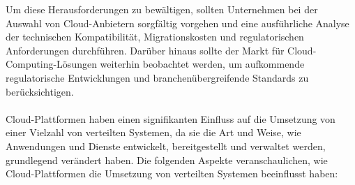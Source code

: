 Um diese Herausforderungen zu bewältigen, sollten Unternehmen bei der Auswahl von Cloud-Anbietern sorgfältig vorgehen und eine ausführliche Analyse der technischen Kompatibilität, Migrationskosten und regulatorischen Anforderungen durchführen. Darüber hinaus sollte der Markt für Cloud-Computing-Lösungen weiterhin beobachtet werden, um aufkommende regulatorische Entwicklungen und branchenübergreifende Standards zu berücksichtigen.
\\\\
Cloud-Plattformen haben einen signifikanten Einfluss auf die Umsetzung von einer Vielzahl von verteilten Systemen, da sie die Art und Weise, wie Anwendungen und Dienste entwickelt, bereitgestellt und verwaltet werden, grundlegend verändert haben. Die folgenden Aspekte veranschaulichen, wie Cloud-Plattformen die Umsetzung von verteilten Systemen beeinflusst haben:
